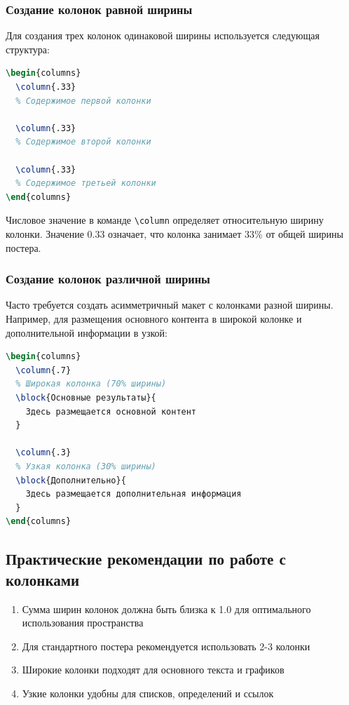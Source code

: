 \documentclass[12pt,a4paper]{article}
\begin{document}
\subsubsection{Создание колонок равной ширины}

Для создания трех колонок одинаковой ширины используется следующая структура:

\begin{lstlisting}[language=TeX]
\begin{columns}
  \column{.33}
  % Содержимое первой колонки
  
  \column{.33}
  % Содержимое второй колонки
  
  \column{.33}
  % Содержимое третьей колонки
\end{columns}
\end{lstlisting}

Числовое значение в команде \texttt{\textbackslash column} определяет относительную ширину колонки. Значение 0.33 означает, что колонка занимает 33\% от общей ширины постера.

\subsubsection{Создание колонок различной ширины}

Часто требуется создать асимметричный макет с колонками разной ширины. Например, для размещения основного контента в широкой колонке и дополнительной информации в узкой:

\begin{lstlisting}[language=TeX]
\begin{columns}
  \column{.7}
  % Широкая колонка (70% ширины)
  \block{Основные результаты}{
    Здесь размещается основной контент
  }
  
  \column{.3}
  % Узкая колонка (30% ширины)
  \block{Дополнительно}{
    Здесь размещается дополнительная информация
  }
\end{columns}
\end{lstlisting}

\subsection{Практические рекомендации по работе с колонками}

\begin{enumerate}
    \item Сумма ширин колонок должна быть близка к 1.0 для оптимального использования пространства
    \item Для стандартного постера рекомендуется использовать 2-3 колонки
    \item Широкие колонки подходят для основного текста и графиков
    \item Узкие колонки удобны для списков, определений и ссылок
\end{enumerate}
\end{document}
